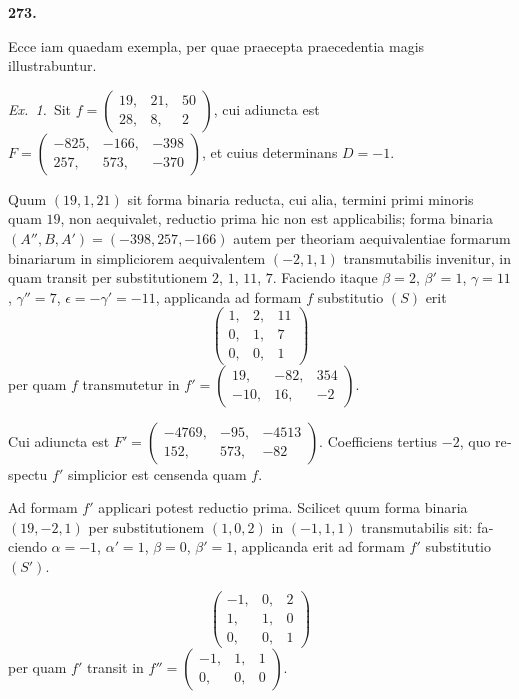 \documentclass[12pt,a4paper]{article}
\theoremstyle{plain}
\theoremstyle{definition}
\theoremstyle{remark}
\begin{document}
\begin{otherlanguage}{latin}

\textbf{273.}

Ecce iam quaedam exempla, per quae praecepta praecedentia magis illustrabuntur.

\textit{Ex.\ 1.}\ Sit $f = \begin{pmatrix} 19, & 21, & 50 \\ 28, & 8, & 2 \end{pmatrix}$, cui adiuncta est $F = \begin{pmatrix} -825, & -166, & -398 \\ 257, & 573, & -370 \end{pmatrix}$, et cuius determinans $D = -1$.

Quum $(19, 1, 21)$ sit forma binaria reducta, cui alia, termini primi minoris quam $19$, non aequivalet, reductio prima hic non est applicabilis; forma binaria $(A'', B, A') = (-398, 257, -166)$ autem per theoriam aequivalentiae formarum binariarum in simpliciorem aequivalentem $(-2, 1, 1)$ transmutabilis invenitur, in quam transit per substitutionem $2$, $1$, $11$, $7$. Faciendo itaque $\beta = 2$, $\beta' = 1$, $\gamma = 11$, $\gamma'' = 7$, $\epsilon = -\gamma' = -11$, applicanda ad formam $f$ substitutio $(S)$ erit
\[
\begin{pmatrix} 1, & 2, & 11 \\ 0, & 1, & 7 \\ 0, & 0, & 1 \end{pmatrix}
\]
per quam $f$ transmutetur in $f' = \begin{pmatrix} 19, & -82, & 354 \\ -10, & 16, & -2 \end{pmatrix}$.

Cui adiuncta est $F' = \begin{pmatrix} -4769, & -95, & -4513 \\ 152, & 573, & -82 \end{pmatrix}$. Coefficiens tertius $-2$, quo respectu $f'$ simplicior est censenda quam $f$.

Ad formam $f'$ applicari potest reductio prima. Scilicet quum forma binaria $(19, -2, 1)$ per substitutionem $(1, 0, 2)$ in $(-1, 1, 1)$ transmutabilis sit: faciendo $\alpha = -1$, $\alpha' = 1$, $\beta = 0$, $\beta' = 1$, applicanda erit ad formam $f'$ substitutio $(S')$.

\[
\begin{pmatrix} -1, & 0, & 2 \\ 1, & 1, & 0 \\ 0, & 0, & 1 \end{pmatrix}
\]
per quam $f'$ transit in $f'' = \begin{pmatrix} -1, & 1, & 1 \\ 0, & 0, & 0 \end{pmatrix}$.


\end{otherlanguage}
\end{document}
